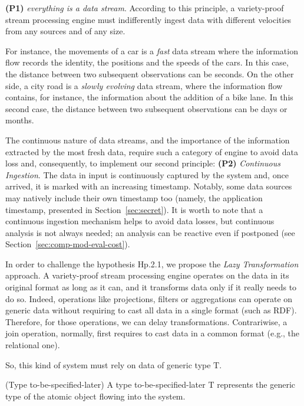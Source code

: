\textbf{(P1)} \textit{everything is a data stream}. According to this principle, a variety-proof stream processing engine must indifferently ingest data with different velocities from any sources and of any size. 

For instance, the movements of a car is a \textit{fast} data stream where the information flow records the identity, the positions and the speeds of the cars. In this case, the distance between two subsequent observations can be seconds. On the other side, a city road is a \textit{slowly evolving} data stream, where the information flow contains, for instance, the information about the addition of a bike lane.
In this second case, the distance between two subsequent observations can be days or months. 

The continuous nature of data streams, and the importance of the information extracted by the most fresh data, require such a category of engine to avoid data loss and, consequently, to implement our second principle: \textbf{(P2)} \textit{Continuous Ingestion}. The data in input is continuously captured by the system and, once arrived, it is marked with an increasing timestamp. Notably, some data sources may natively include their own timestamp too (namely, the application timestamp, presented in Section~\ref{sec:secret}). It is worth to note that a continuous ingestion mechanism helps to avoid data losses, but continuous analysis is not always needed; an analysis can be reactive even if postponed (see Section~\ref{sec:comp-mod-eval-cost}).

In order to challenge the hypothesis \textsf{Hp.2.1}, we propose the \textit{Lazy Transformation} approach. 
A variety-proof stream processing engine operates on the data in its original format as long as it can, and it transforms data only if it really needs to do so. Indeed, operations like projections, filters or aggregations can operate on generic data without requiring to cast all data in a single format (such as RDF). Therefore, for those operations, we can delay transformations. Contrariwise, a join operation, normally, first requires to cast data in a common format (e.g., the relational one). 

So, this kind of system must rely on data of generic type $\mathrm{T}$.

\begin{Definition}
(Type to-be-specified-later) A type to-be-specified-later $\mathrm{T}$ represents the generic type of the atomic object flowing into the system.
\end{Definition}

